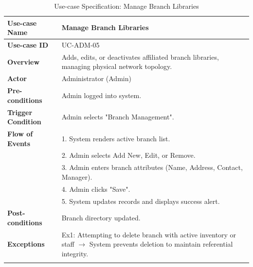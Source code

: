 \begin{longtable}{|p{3.5cm}|p{11.5cm}|}
    \hline
    \textbf{Use-case Name} & \textbf{Manage Branch Libraries} \\
    \hline
    \textbf{Use-case ID} & UC-ADM-05 \\
    \hline
    \textbf{Overview} & Adds, edits, or deactivates affiliated branch libraries, managing physical network topology. \\
    \hline
    \textbf{Actor} & Administrator (Admin) \\
    \hline
    \textbf{Pre-conditions} & Admin logged into system. \\
    \hline
    \textbf{Trigger Condition} & Admin selects "Branch Management". \\
    \hline
    \textbf{Flow of Events} & 
    1. System renders active branch list.\\ 
 & 
    2. Admin selects Add New, Edit, or Remove.\\ 
 & 
    3. Admin enters branch attributes (Name, Address, Contact, Manager).\\ 
 & 
    4. Admin clicks "Save".\\ 
 & 
    5. System updates records and displays success alert. \\
    \hline
    \textbf{Post-conditions} & Branch directory updated. \\
    \hline
    \textbf{Exceptions} & 
    Ex1: Attempting to delete branch with active inventory or staff $\rightarrow$ System prevents deletion to maintain referential integrity. \\
    \hline
    \caption{Use-case Specification: Manage Branch Libraries} \\
\end{longtable}

